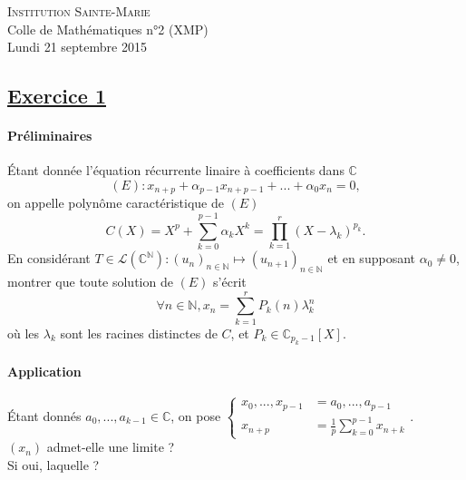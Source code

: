 \documentclass[12pt,a4paper]{report}
\begin{document}
\newcommand{\rA}{\mathcal{A}}
\newcommand{\rB}{\mathcal{B}}
\newcommand{\rC}{\mathcal{C}}
\newcommand{\rG}{\mathcal{G}}
\newcommand{\rF}{\mathcal{F}}
\newcommand{\rP}{\mathcal{P}}
\newcommand{\rH}{\mathcal{H}}
\newcommand{\rR}{\mathcal{R}}
\newcommand{\rE}{\mathcal{E}}
\newcommand{\rL}{\mathcal{L}}
\newcommand{\rM}{\mathcal{M}}
\newcommand{\bK}{\mathbb{K}}
\newcommand{\bQ}{\mathbb{Q}}
\newcommand{\bR}{\mathbb{R}}
\newcommand{\bZ}{\mathbb{Z}}
\newcommand{\bN}{\mathbb{N}}
\newcommand{\bC}{\mathbb{C}}
\newcommand{\bP}{\mathbb{P}}
\newcommand{\bF}{\mathbb{F}}

\ifpdf
{}
\else
{}
\fi

\pagestyle{empty} %

\noindent \textsc{Institution Sainte-Marie}\\
Colle de Mathématiques n°2 (XMP)\\
Lundi 21 septembre 2015\\


\subsection*{\underline{Exercice 1}} %

\paragraph{Préliminaires}
Étant donnée l'équation récurrente linaire à coefficients dans $\bC$ 
$$(E):x_{n+p}+\alpha_{p-1}x_{n+p-1}+...+\alpha_{0}x_{n}=0,$$ 
on appelle polynôme caractéristique de $(E)$ $$C(X)=X^p+\sum\limits_{k=0}^{p-1}\alpha_{k}X^k=\prod\limits_{k=1}^r(X-\lambda_k)^{p_k}.$$
En considérant $T\in\rL(\bC^{\bN}) : (u_n)_{n\in\bN} \mapsto (u_{n+1})_{n\in\bN}$ et en supposant $\alpha_0\neq 0$, montrer que toute solution de $(E)$ s'écrit $$\forall n\in \bN, x_n = \sum\limits_{k=1}^rP_k(n)\lambda_k^n$$ où les $\lambda_k$ sont les racines distinctes de $C$, et $P_k\in\bC_{p_k-1}[X]$.

\paragraph{Application}
Étant donnés $a_0, ..., a_{k-1}\in \bC$, on pose 
$\left\lbrace\begin{array}{ll}
x_0, ..., x_{p-1}&=a_0, ..., a_{p-1}\\
x_{n+p}&=\frac{1}{p}\sum\limits_{k=0}^{p-1}x_{n+k}
\end{array}\right.$.\\
$(x_n)$ admet-elle une limite ?\\
Si oui, laquelle ?
\end{document}
